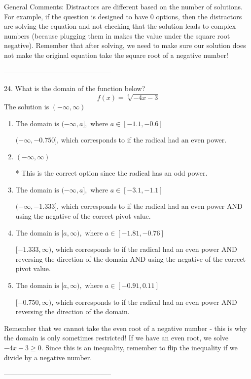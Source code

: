 \documentclass{extbook}[14pt]
\begin{document}
General Comments: Distractors are different based on the number of solutions. For example, if the question is designed to have 0 options, then the distractors are solving the equation and not checking that the solution leads to complex numbers (because plugging them in makes the value under the square root negative). Remember that after solving, we need to make sure our solution does not make the original equation take the square root of a negative number!

-----------------------------------------------

24. What is the domain of the function below?
\[ f(x) = \sqrt[3]{-4 x - 3} \] 
The solution is $ (-\infty, \infty) $ 

\begin{enumerate}[label=\Alph*.] 
\item $ \text{The domain is } (-\infty, a], \text{   where } a \in [-1.1, -0.6] $ 

 $(-\infty, -0.750]$, which corresponds to if the radical had an even power. 
\item $ (-\infty, \infty) $ 

 * This is the correct option since the radical has an odd power. 
\item $ \text{The domain is } (-\infty, a], \text{   where } a \in [-3.1, -1.1] $ 

 $(-\infty, -1.333]$, which corresponds to if the radical had an even power AND using the negative of the correct pivot value. 
\item $ \text{The domain is } [a, \infty), \text{   where } a \in [-1.81, -0.76] $ 

 $[-1.333, \infty)$, which corresponds to if the radical had an even power AND reversing the direction of the domain AND using the negative of the correct pivot value. 
\item $ \text{The domain is } [a, \infty), \text{   where } a \in [-0.91, 0.11] $ 

 $[-0.750, \infty)$, which corresponds to if the radical had an even power AND reversing the direction of the domain. 
\end{enumerate} 
 
Remember that we cannot take the even root of a negative number - this is why the domain is only sometimes restricted! If we have an even root, we solve $-4 x - 3 \geq 0$. Since this is an inequality, remember to flip the inequality if we divide by a negative number.

-----------------------------------------------
\end{document}
